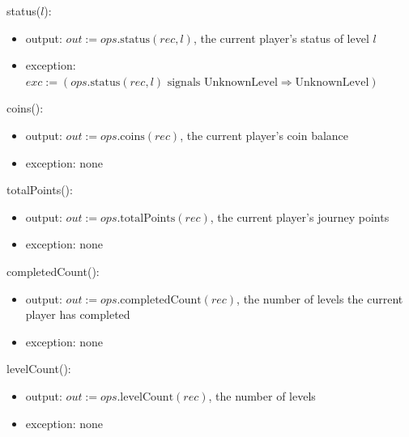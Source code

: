 \documentclass[10pt, titlepage]{article}
\newcommand{\T}[1]{\mathit{#1}}          %
\newcommand{\out}{\mathit{out}}
\newcommand{\exc}{\mathit{exc}}
\begin{document}
\begin{samepage}
\noindent status($l$):
\begin{itemize}
\item output: $\out := \T{ops}.\text{status}(\T{rec}, l)$, the current
  player's status of level $l$
\item exception: $\exc := (\T{ops}.\text{status}(\T{rec}, l) \text{ signals
  UnknownLevel} \Rightarrow \text{UnknownLevel})$
\end{itemize}
\end{samepage}
\par\pagebreak[0]

\begin{samepage}
\noindent coins():
\begin{itemize}
\item output: $\out := \T{ops}.\text{coins}(\T{rec})$, the current player's
  coin balance
\item exception: none
\end{itemize}
\end{samepage}
\par\pagebreak[0]

\begin{samepage}
\noindent totalPoints():
\begin{itemize}
\item output: $\out := \T{ops}.\text{totalPoints}(\T{rec})$, the current
  player's journey points
\item exception: none
\end{itemize}
\end{samepage}
\par\pagebreak[0]

\begin{samepage}
\noindent completedCount():
\begin{itemize}
\item output: $\out := \T{ops}.\text{completedCount}(\T{rec})$, the number of
  levels the current player has completed
\item exception: none
\end{itemize}
\end{samepage}
\par\pagebreak[0]

\begin{samepage}
\noindent levelCount():
\begin{itemize}
\item output: $\out := \T{ops}.\text{levelCount}(\T{rec})$, the number of
  levels
\item exception: none
\end{itemize}
\end{samepage}
\par\pagebreak[0]
\end{document}
